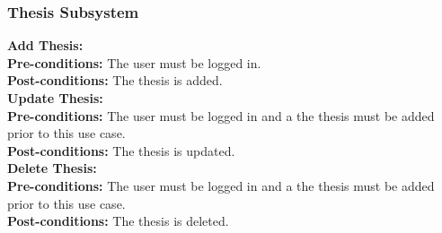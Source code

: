 \documentclass{article}
\begin{document}
			\subsubsection{Thesis Subsystem}
				\textbf{Add Thesis:}\\
					\indent \textbf{Pre-conditions:} The user must be logged in.\\
					\indent \textbf{Post-conditions:} The thesis is added.\\
				\textbf{Update Thesis:}\\
					\indent \textbf{Pre-conditions:} The user must be logged in and a the thesis must be added prior to this use case.\\
					\indent \textbf{Post-conditions:} The thesis is updated.\\
				\textbf{Delete Thesis:}\\
					\indent \textbf{Pre-conditions:} The user must be logged in and a the thesis must be added prior to this use case.\\
					\indent \textbf{Post-conditions:} The thesis is deleted.\\
\end{document}
